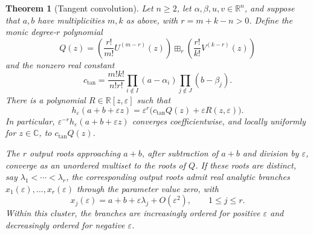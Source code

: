 \documentclass[10pt,a4paper]{amsart}
\newtheorem{theorem}{Theorem}
\newcommand{\C}{\mathbb C}
\newcommand{\R}{\mathbb R}
\newcommand{\eps}{\varepsilon}
\begin{document}
\begin{theorem}[Tangent convolution]\label{thm:tangent-convolution}
Let \(n\geq2\), let \(\alpha,\beta,u,v\in\R^n\), and suppose that
\(a,b\) have multiplicities \(m,k\) as above, with
\(r=m+k-n>0\).  Define the monic degree-\(r\) polynomial
\begin{equation}\label{eq:tangent-convolution-polynomial}
 Q(z)=
 \left(\frac{r!}{m!}U^{(m-r)}(z)\right)
 \boxplus_r
 \left(\frac{r!}{k!}V^{(k-r)}(z)\right)
\end{equation}
and the nonzero real constant
\begin{equation}\label{eq:tangent-convolution-constant}
 c_{\mathrm{tan}}=\frac{m!k!}{n!r!}
       \prod_{i\notin I}(a-\alpha_i)
       \prod_{j\notin J}(b-\beta_j).
\end{equation}
There is a polynomial \(R\in\R[z,\eps]\) such that
\begin{equation}\label{eq:tangent-convolution-expansion}
 h_\eps(a+b+\eps z)
   =\eps^r\bigl(c_{\mathrm{tan}}Q(z)+\eps R(z,\eps)\bigr).
\end{equation}
In particular, \(\eps^{-r}h_\eps(a+b+\eps z)\) converges
coefficientwise, and locally uniformly for \(z\in\C\), to \(c_{\mathrm{tan}}Q(z)\).

The \(r\) output roots approaching \(a+b\), after subtraction of
\(a+b\) and division by \(\eps\), converge as an unordered multiset
to the roots of \(Q\).  If these roots are distinct, say
\(\lambda_1<\cdots<\lambda_r\), the corresponding output roots admit
real analytic branches \(x_1(\eps),\ldots,x_r(\eps)\) through the
parameter value zero,
with
\begin{equation}\label{eq:tangent-convolution-branches}
 x_j(\eps)=a+b+\eps\lambda_j+O(\eps^2),
 \qquad 1\leq j\leq r.
\end{equation}
Within this cluster, the branches are increasingly ordered for positive
\(\eps\) and decreasingly ordered for negative \(\eps\).
\end{theorem}
\end{document}
